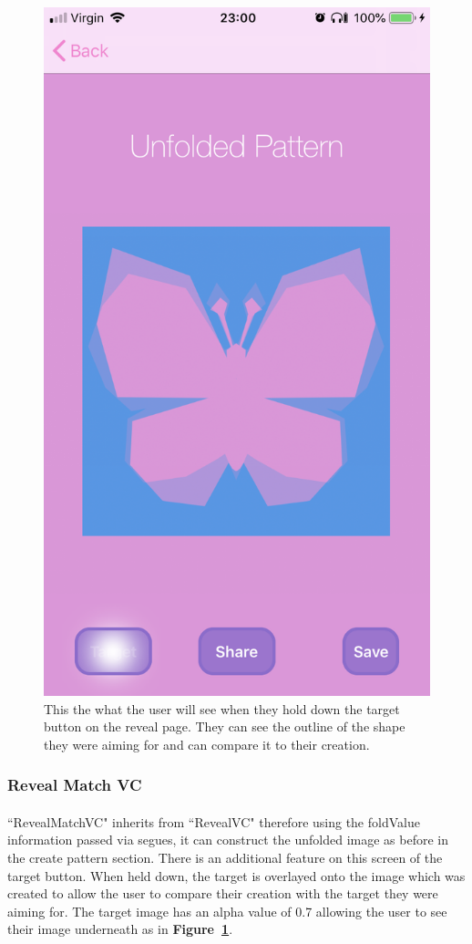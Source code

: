 \documentclass[11pt]{article}
\begin{document}
\begin{figure}[!ht]
\begin{minipage}{0.45\textwidth}
                            \includegraphics[width=0.7\linewidth]{KiriZen/matchUnfoldedPattern}
                            \caption{This the what the user will see when they hold down the target button on the reveal page. They can see the outline of the shape they were aiming for and can compare it to their creation.}
                            \label{fig:kiriZen-matchUnfoldedPattern}
                        \end{minipage}
                    \end{figure}
            
 \subsubsection{Reveal Match VC}
            \paragraph{}
            ``RevealMatchVC" inherits from ``RevealVC" therefore using the foldValue information passed via segues, it can construct the unfolded image as before in the create pattern section. There is an additional feature on this screen of the target button. When held down, the target is overlayed onto the image which was created to allow the user to compare their creation with the target they were aiming for. The target image has an alpha value of 0.7 allowing the user to see their image underneath as in \textbf{Figure~\ref{fig:kiriZen-matchUnfoldedPattern}}.
\end{document}

